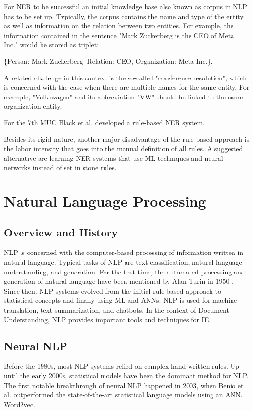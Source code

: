 For \ac{NER} to be successful an initial knowledge base also known as corpus in \ac{NLP} has to be set up. Typically, the corpus contains the name and type of the entity as well as information on the relation between two entities. For example, the information contained in the sentence "Mark Zuckerberg is the CEO of Meta Inc." would be stored as triplet: 

\{Person: Mark Zuckerberg, Relation: CEO, Organization: Meta Inc.\}.

A related challenge in this context is the so-called "coreference resolution", which is concerned with the case when there are multiple names for the same entity. For example, "Volkswagen" and its abbreviation "VW" should be linked to the same organization entity.
\cite{cowie1996information,cardie1997empirical}

For the 7th \ac{MUC} Black et al.\cite{black1998facile} developed a rule-based \ac{NER} system.

Besides its rigid nature, another major disadvantage of the rule-based approach is the labor intensity that goes into the manual definition of all rules. A suggested alternative are learning \ac{NER} systems that use \ac{ML} techniques and neural networks instead of set in stone rules.
\cite{hobbs2010information}

\section{Natural Language Processing}
\subsection{Overview and History}
\ac{NLP} is concerned with the computer-based processing of information written in natural language. Typical tasks of \ac{NLP} are text classification, natural language understanding, and generation. For the first time, the automated processing and generation of natural language have been mentioned by Alan Turin in 1950 \cite{Turing1950}. Since then, \ac{NLP}-systems evolved from the initial rule-based approach to statistical concepts and finally using \ac{ML} and \acfp{ANN}.
\ac{NLP} is used for machine translation, text summarization, and chatbots.
In the context of Document Understanding, \ac{NLP} provides important tools and techniques for \acf{IE}. 
\cite{church1995commercial,aiello2002document}
\subsection{Neural NLP}
Before the 1980s, most \ac{NLP} systems relied on complex hand-written rules. Up until the early 2000s, statistical models have been the dominant method for \ac{NLP}. The first notable breakthrough of neural \ac{NLP} happened in 2003, when Benio et al. \cite{bengio} outperformed the state-of-the-art statistical language models using an \ac{ANN}.
Word2vec.
